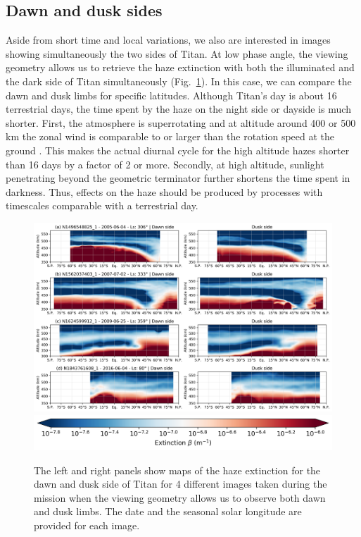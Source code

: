 \subsection{Dawn and dusk sides}

Aside from short time and local variations, we also are interested in images showing simultaneously the two sides
of Titan. At low phase angle, the viewing geometry allows us to retrieve the haze extinction with both the
illuminated and the dark side of Titan simultaneously  (Fig.~\ref{fig:dawn_dusk}).
In this case, we can compare the dawn and dusk limbs for
specific latitudes. Although Titan's day is about 16 terrestrial
days, the time spent by the haze on the night side or dayside is much shorter.
First, the atmosphere is superrotating and at altitude around 400 or 500 km the zonal wind is comparable to or
larger than the rotation speed at the ground \citep{Flasar2005, Achterberg2011, Lebonnois2012, Lellouch2019}.
This makes the actual diurnal cycle for the high altitude hazes shorter than 16 days by a factor of 2 or more.
Secondly, at high altitude, sunlight penetrating beyond the geometric terminator further shortens the time spent in darkness.
Thus, effects on the haze should be produced by processes with timescales
comparable with a terrestrial day.

\begin{figure}[!ht]
    \centering
    \includegraphics[width=\textwidth]{Fig/Dawn_dusk.png}
    \includegraphics[width=.5\textwidth]{Fig/Extinction_colorbar.png}\vspace{-.3cm}
    \caption{The left and right panels show maps of the haze extinction for the dawn and dusk side of
    Titan for 4 different images taken during the mission when the viewing geometry allows us to observe both dawn and dusk
    limbs. The date and the seasonal solar longitude are provided for each image.}
    \label{fig:dawn_dusk}
\end{figure}

